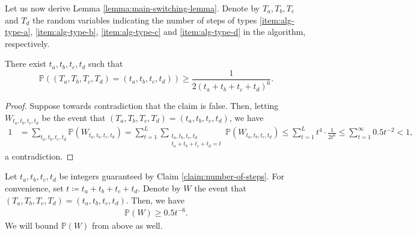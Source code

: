 \documentclass[11pt,a4paper,oneside,reqno]{amsart}
\renewcommand{\Pr}{\mathbb{P}}
\newcommand{\1}{\mathbbm{1}} %
\renewcommand{\le}{\leqslant}
\renewcommand{\ge}{\geqslant}
\begin{document}
Let us now derive Lemma \ref{lemma:main-switching-lemma}. Denote by $T_a, T_b, T_c$ and $T_d$ the random variables indicating the number of steps of types \ref{item:alg-type-a}, \ref{item:alg-type-b}, \ref{item:alg-type-c} and \ref{item:alg-type-d} in the algorithm, respectively. 
\begin{claim}\label{claim:number-of-steps}
    There exist $t_a, t_b, t_c, t_d$ such that
    \[
        \Pr((T_a, T_b, T_c, T_d) = (t_a, t_b, t_c, t_d)) \ge \frac{1}{2(t_a+t_b+t_c+t_d)^6}.
    \]
\end{claim}
\begin{proof}
    Suppose towards contradiction that the claim is false. Then, letting $W_{t_a, t_b, t_c, t_d}$ be the event that $(T_a, T_b, T_c, T_d) = (t_a, t_b, t_c, t_d)$, we have
    \begin{align*}
        1 &= \sum_{t_a, t_b, t_c, t_d} \Pr(W_{t_a, t_b, t_c, t_d}) = \sum_{t=1}^{L} \sum_{\substack{t_a, t_b, t_c, t_d \\ t_a + t_b + t_c + t_d = t}} \Pr(W_{t_a, t_b, t_c, t_d}) 
        \le \sum_{t=1}^{L} t^4 \cdot \frac{1}{2t^6} \le \sum_{t=1}^{\infty} 0.5 t^{-2} < 1,
    \end{align*}
    a contradiction.
\end{proof}

Let $t_a, t_b, t_c, t_d$ be integers guaranteed by Claim \ref{claim:number-of-steps}. For convenience, set $t \coloneqq t_a + t_b + t_c + t_d$. Denote by $W$ the event that $(T_a, T_b, T_c, T_d) = (t_a, t_b, t_c, t_d)$. Then, we have
\begin{align}\label{align:W-probability-lower-bound}
    \Pr(W) \ge 0.5 t^{-6}.
\end{align}
We will bound $\Pr(W)$ from above as well.
\end{document}
